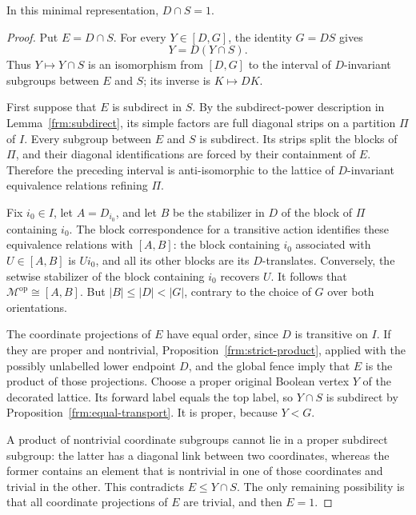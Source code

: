 \begin{proposition}\label{ext:trivial-intersection}
In this minimal representation, $D\cap S=1$.
\end{proposition}
\begin{proof}
Put $E=D\cap S$.  For every $Y\in[D,G]$, the identity $G=DS$ gives
\[
                  Y=D(Y\cap S).
\]
Thus $Y\mapsto Y\cap S$ is an isomorphism from $[D,G]$ to the interval
of $D$-invariant subgroups between $E$ and $S$; its inverse is
$K\mapsto DK$.

First suppose that $E$ is subdirect in $S$.  By the subdirect-power
description in Lemma~\ref{frm:subdirect}, its simple factors are
full diagonal strips on a partition $\Pi$ of $I$.  Every subgroup
between $E$ and $S$ is subdirect.  Its strips split the blocks of $\Pi$,
and their diagonal identifications are forced by their containment of
$E$.  Therefore the preceding interval is anti-isomorphic to the
lattice of $D$-invariant equivalence relations refining $\Pi$.

Fix $i_0\in I$, let $A=D_{i_0}$, and let $B$ be the stabilizer in $D$
of the block of $\Pi$ containing $i_0$.  The block correspondence for a
transitive action identifies these equivalence relations with $[A,B]$:
the block containing $i_0$ associated with $U\in[A,B]$ is $U i_0$,
and all its other blocks are its $D$-translates.  Conversely, the
setwise stabilizer of the block containing $i_0$ recovers $U$.
It follows that $\mathcal M^{\mathrm{op}}\cong[A,B]$.  But
$|B|\le |D|<|G|$, contrary to the choice of $G$ over both orientations.

The coordinate projections of $E$ have equal order, since $D$ is
transitive on $I$.  If they are proper and nontrivial,
Proposition~\ref{frm:strict-product}, applied with the possibly unlabelled
lower endpoint $D$, and the global fence imply that $E$ is the product
of those projections.  Choose a proper original Boolean vertex $Y$
of the decorated lattice.  Its forward label equals the top label,
so $Y\cap S$ is subdirect by Proposition~\ref{frm:equal-transport}.
It is proper, because $Y<G$.

A product of nontrivial coordinate subgroups cannot lie in a proper
subdirect subgroup: the latter has a diagonal link between two
coordinates, whereas the former contains an element that is nontrivial
in one of those coordinates and trivial in the other.  This contradicts
$E\le Y\cap S$.  The only remaining possibility is that all coordinate
projections of $E$ are trivial, and then $E=1$.
\end{proof}

